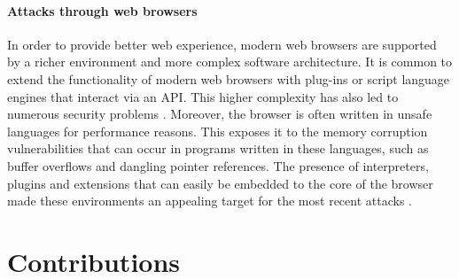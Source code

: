 \paragraph{Attacks through web browsers}
In order to provide better web experience, modern web browsers are supported by a richer environment and more complex software architecture. It is common to extend the functionality of modern web browsers with plug-ins or script language engines that interact via an API. This higher complexity has also led to numerous security problems \cite{harden,6167512}. Moreover, the browser is often written in unsafe languages for performance reasons. This exposes it to the memory corruption vulnerabilities that can occur in programs written in these languages, such as buffer overflows and dangling pointer references. The presence of interpreters, plugins and extensions that can easily be embedded to the core of the browser made these environments an appealing target for the most recent attacks \cite{Heiderich:2012:SAS:2382196.2382276, Brahmasani:2012:PXA:2382756.2382768}.


\section{Contributions}
 


